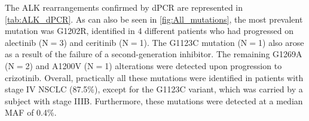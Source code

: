 The ALK rearrangements confirmed by dPCR are represented in \autoref{tab:ALK_dPCR}. As can also be seen in \autoref{fig:All_mutations}, the most prevalent mutation was G1202R, identified in 4 different patients who had progressed on alectinib (N$=$3) and ceritinib (N$=$1). The G1123C mutation (N$=$1) also arose as a result of the failure of a second-generation inhibitor. The remaining G1269A (N$=$2) and A1200V (N$=$1) alterations were detected upon progression to crizotinib. Overall, practically all these mutations were identified in patients with stage IV NSCLC (87.5\%), except for the G1123C variant, which was carried by a subject with stage IIIB. Furthermore, these mutations were detected at a median MAF of 0.4\%.

\begin{table}[ht]
\centering
{}
\caption{Characteristics of the ALK mutations identified in this study.}
\label{tab:ALK_dPCR}
\end{table}

